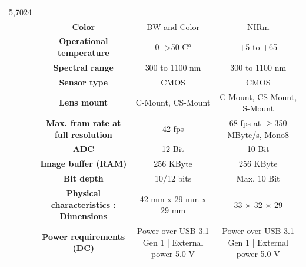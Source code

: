 \begin{table}[H]
{\begin{tabular}{ccc|cc|cc|}
  \multicolumn{2}{c|}{5,7024} \\
\multicolumn{1}{|c|}{} &
  \multicolumn{2}{c|}{\cellcolor[HTML]{EFEFEF}\textbf{Color}} &
  \multicolumn{2}{c|}{\cellcolor[HTML]{EFEFEF}BW and Color} &
  \multicolumn{2}{c|}{\cellcolor[HTML]{EFEFEF}NIRm} \\
\multicolumn{1}{|c|}{} &
  \multicolumn{2}{c|}{\textbf{Operational temperature}} &
  \multicolumn{2}{c|}{0 -\textgreater 50 C°} &
  \multicolumn{2}{c|}{+5 to +65} \\
\multicolumn{1}{|c|}{} &
  \multicolumn{2}{c|}{\cellcolor[HTML]{EFEFEF}\textbf{Spectral range}} &
  \multicolumn{2}{c|}{\cellcolor[HTML]{EFEFEF}300 to 1100 nm} &
  \multicolumn{2}{c|}{\cellcolor[HTML]{EFEFEF}300 to 1100 nm} \\
\multicolumn{1}{|c|}{} &
  \multicolumn{2}{c|}{\textbf{Sensor type}} &
  \multicolumn{2}{c|}{CMOS} &
  \multicolumn{2}{c|}{CMOS} \\
\multicolumn{1}{|c|}{} &
  \multicolumn{2}{c|}{\cellcolor[HTML]{EFEFEF}\textbf{Lens mount}} &
  \multicolumn{2}{c|}{\cellcolor[HTML]{EFEFEF}C-Mount, CS-Mount} &
  \multicolumn{2}{c|}{\cellcolor[HTML]{EFEFEF}C-Mount, CS-Mount, S-Mount} \\
\multicolumn{1}{|c|}{} &
  \multicolumn{2}{c|}{\textbf{Max. fram rate at full resolution}} &
  \multicolumn{2}{c|}{42 fps} &
  \multicolumn{2}{c|}{68 fps at $\geq$350 MByte/s, Mono8} \\
\multicolumn{1}{|c|}{} &
  \multicolumn{2}{c|}{\cellcolor[HTML]{EFEFEF}\textbf{ADC}} &
  \multicolumn{2}{c|}{\cellcolor[HTML]{EFEFEF}12 Bit} &
  \multicolumn{2}{c|}{\cellcolor[HTML]{EFEFEF}10 Bit} \\
\multicolumn{1}{|c|}{} &
  \multicolumn{2}{c|}{\textbf{Image buffer (RAM)}} &
  \multicolumn{2}{c|}{256 KByte} &
  \multicolumn{2}{c|}{256 KByte} \\
\multicolumn{1}{|c|}{} &
  \multicolumn{2}{c|}{\cellcolor[HTML]{EFEFEF}\textbf{Bit depth}} &
  \multicolumn{2}{c|}{\cellcolor[HTML]{EFEFEF}10/12 bits} &
  \multicolumn{2}{c|}{\cellcolor[HTML]{EFEFEF}Max. 10 Bit} \\
\multicolumn{1}{|c|}{} &
  \multicolumn{2}{c|}{\textbf{Physical characteristics : Dimensions}} &
  \multicolumn{2}{c|}{42 mm x 29 mm x 29 mm} &
  \multicolumn{2}{c|}{33 $\times$ 32 $\times$ 29} \\
\multicolumn{1}{|c|}{} &
  \multicolumn{2}{c|}{\cellcolor[HTML]{EFEFEF}\textbf{Power requirements (DC)}} &
  \multicolumn{2}{c|}{\cellcolor[HTML]{EFEFEF}Power over USB 3.1 Gen 1 | External power 5.0 V} &
  \multicolumn{2}{c|}{\cellcolor[HTML]{EFEFEF}Power over USB 3.1 Gen 1 | External power 5.0 V} \\

\end{tabular}}
\end{table}
